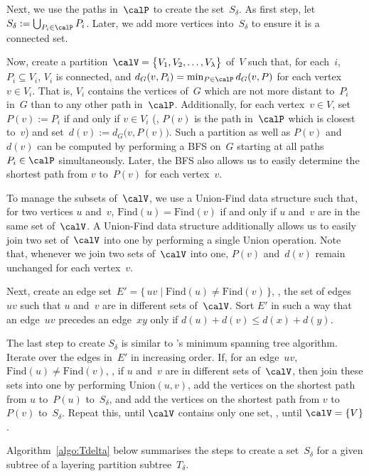 Next, we use the paths in~$\calP$ to create the set~$S_\delta$.
As first step, let $S_\delta := \bigcup_{P_i \in \calP} P_i$.
Later, we add more vertices into~$S_\delta$ to ensure it is a connected set.

Now, create a partition~$\calV = \big \{ V_1, V_2, \ldots, V_\lambda \big \}$ of~$V$ such that, for each~$i$, $P_i \subseteq V_i$, $V_i$ is connected, and $d_G(v, P_i) = \min_{P \in \calP} d_G(v, P)$ for each vertex~$v \in V_i$.
That is, $V_i$ contains the vertices of~$G$ which are not more distant to~$P_i$ in~$G$ than to any other path in~$\calP$.
Additionally, for each vertex~$v \in V$, set $P(v) := P_i$ if and only if $v \in V_i$ (\ie, $P(v)$ is the path in~$\calP$ which is closest to~$v$) and set~$d(v) := d_G \big( v, P(v) \big)$.
Such a partition as well as $P(v)$ and~$d(v)$ can be computed by performing a BFS on~$G$ starting at all paths~$P_i \in \calP$ simultaneously.
Later, the BFS also allows us to easily determine the shortest path from $v$ to~$P(v)$ for each vertex~$v$.

To manage the subsets of~$\calV$, we use a Union-Find data structure such that, for two vertices $u$ and~$v$, $\mathrm{Find}(u) = \mathrm{Find}(v)$ if and only if $u$ and~$v$ are in the same set of~$\calV$.
A Union-Find data structure additionally allows us to easily join two set of~$\calV$ into one by performing a single $\mathrm{Union}$ operation.
Note that, whenever we join two sets of~$\calV$ into one, $P(v)$ and~$d(v)$ remain unchanged for each vertex~$v$.

Next, create an edge set~$E' = \{ \, uv \mid \mathrm{Find}(u) \neq \mathrm{Find}(v) \, \}$, \ie, the set of edges~$uv$ such that $u$ and~$v$ are in different sets of~$\calV$.
Sort $E'$ in such a way that an edge~$uv$ precedes an edge~$xy$ only if $d(u) + d(v) \leq d(x) + d(y)$.

The last step to create $S_\delta$ is similar to 's minimum spanning tree algorithm.
Iterate over the edges in~$E'$ in increasing order.
If, for an edge~$uv$, $\mathrm{Find}(u) \neq \mathrm{Find}(v)$, \ie, if $u$ and~$v$ are in different sets of~$\calV$, then join these sets into one by performing $\mathrm{Union}(u, v)$, add the vertices on the shortest path from $u$ to~$P(u)$ to~$S_\delta$, and add the vertices on the shortest path from $v$ to~$P(v)$ to~$S_\delta$.
Repeat this, until $\calV$ contains only one set, \ie, until $\calV = \{ V \}$.

Algorithm~\ref{algo:Tdelta} below summarises the steps to create a set~$S_\delta$ for a given subtree of a layering partition subtree~$T_\delta$.

